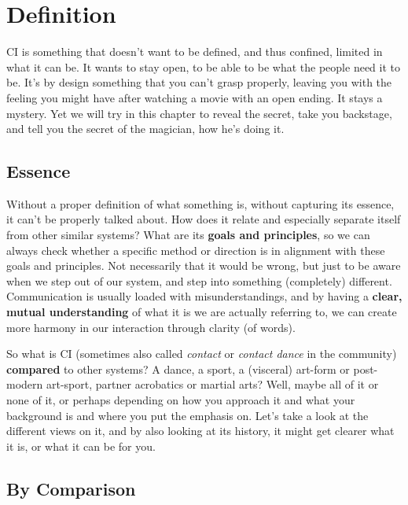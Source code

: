 \chapter{Definition}\label{ch:definition}


CI is something that doesn't want to be defined, and thus confined, limited in what it can be.
It wants to stay open, to be able to be what the people need it to be.
It's by design something that you can't grasp properly, leaving you with the feeling you might have after watching a movie with an open ending.
It stays a mystery.
Yet we will try in this chapter to reveal the secret, take you backstage, and tell you the secret of the magician, how he's doing it.

\section{Essence}\label{sec:essence}

Without a proper definition of what something is, without capturing its essence, it can't be properly talked about.
How does it relate and especially separate itself from other similar systems?
What are its \textbf{goals and principles}, so we can always check whether a specific method or direction is in alignment with these goals and principles.
Not necessarily that it would be wrong, but just to be aware when we step out of our system, and step into something (completely) different.
Communication is usually loaded with misunderstandings, and by having a \textbf{clear, mutual understanding} of what it is we are actually referring to, we can create more harmony in our interaction through clarity (of words).

So what is CI (sometimes also called \textit{contact} or \textit{contact dance} in the community) \textbf{compared} to other systems?
A dance, a sport, a (visceral) art-form or post-modern art-sport, partner acrobatics or martial arts?
Well, maybe all of it or none of it, or perhaps depending on how you approach it and what your background is and where you put the emphasis on.
Let's take a look at the different views on it, and by also looking at its history, it might get clearer what it is, or what it can be for you.

\section{By Comparison}\label{sec:by-comparison}


